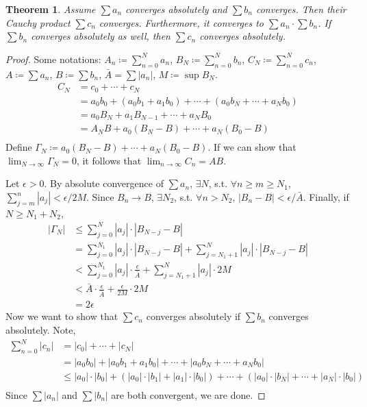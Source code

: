 \documentclass[12pt]{article}
\theoremstyle{plain}
\newtheorem{thm}{Theorem}
\theoremstyle{definition}
\begin{document}
\begin{thm}
    Assume $\sum a_n$ converges absolutely and $\sum b_n$ converges.
    Then their Cauchy product $\sum c_n$ converges.
    Furthermore, it converges to $\sum a_n \cdot \sum b_n$.
    If $\sum b_n$ converges absolutely as well, then $\sum c_n$ converges absolutely.
\end{thm}
\begin{proof}
    Some notations:
    $A_n\coloneqq \sum_{n=0}^N a_n$, $B_N\coloneqq \sum_{n=0}^N b_n$, $C_N\coloneqq \sum_{n=0}^N
    c_n$, $A\coloneqq \sum a_n$, $B\coloneqq \sum b_n$, $\bar{A}=\sum |a_n|$, $M\coloneqq \sup B_N$. 
    $$\begin{aligned}
        C_N&=c_0+\cdots + c_N\\
        &= a_0b_0 + (a_0b_1+a_1b_0) + \cdots + (a_0b_N+\cdots + a_Nb_0)\\
        &= a_0B_N + a_1B_{N-1} + \cdots + a_NB_0\\
        &= A_N B + a_0(B_N-B) + \cdots + a_N(B_0-B)\\
    \end{aligned}$$
    Define $\Gamma_N\coloneqq a_0(B_N-B) + \cdots + a_N(B_0-B)$.
    If we can show that $\lim_{N\rightarrow\infty}\Gamma_N=0$, it follows that $\lim_{n\rightarrow\infty}
    C_n = AB$.

    Let $\epsilon>0$.
    By absolute convergence of $\sum a_n$, $\exists N$, s.t. $\forall n\geq m\geq N_1$,  $\sum_{j=m}^n
    |a_j|<\epsilon/2M$.
    Since $B_n\rightarrow B$, $\exists N_2$, s.t. $\forall n>N_2$, $|B_n-B|<\epsilon/\bar{A}$.
    Finally, if $N\geq N_1+N_2$,
    $$\begin{aligned}
        |\Gamma_N|&\leq \sum_{j=0}^N |a_j|\cdot |B_{N-j}-B|\\
        &= \sum_{j=0}^{N_1} |a_j|\cdot |B_{N-j}-B| + \sum_{j=N_1+1}^{N} |a_j|\cdot |B_{N-j}-B|\\
        &<\sum_{j=0}^{N_1} |a_j|\cdot\frac{\epsilon}{\bar{A}} + \sum_{j= N_1+1}^N |a_j|\cdot 2M\\
        &<\bar{A}\cdot\frac{\epsilon}{\bar{A}} + \frac{\epsilon}{2M}\cdot 2M\\
        &=2\epsilon
    \end{aligned}$$
    Now we want to show that $\sum c_n$ converges absolutely if $\sum b_n$ converges absolutely.
    Note,
    $$\begin{aligned}
        \sum_{n=0}^N |c_n| &= |c_0|+\cdots+|c_N|\\
        &=|a_0b_0| + |a_0b_1+a_1b_0| + \cdots + |a_0b_N + \cdots + a_Nb_0|\\
        &\leq|a_0|\cdot |b_0| + \left(|a_0|\cdot |b_1|+|a_1|\cdot|b_0|\right)
        + \cdots + \left(|a_0|\cdot|b_N| + \cdots + |a_N|\cdot|b_0|\right)\\
    \end{aligned}$$
    Since $\sum |a_n|$ and $\sum |b_n|$ are both convergent, we are done.
\end{proof}
\end{document}
